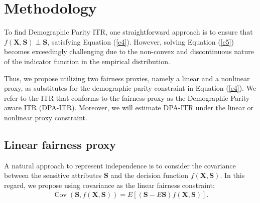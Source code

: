 \documentclass[12pt]{article}
\theoremstyle{plain}
\theoremstyle{definition}
\theoremstyle{remark}
\begin{document}
\section{Methodology}

To find    Demographic Parity ITR, one straightforward approach is to ensure that $f(\boldsymbol{X}, \boldsymbol{S}) \perp \boldsymbol{S}$, satisfying Equation (\ref{e4}). However, solving Equation (\ref{e5}) becomes exceedingly challenging due to the non-convex and discontinuous nature of the indicator function in the empirical distribution.

Thus, we propose utilizing two fairness proxies, namely a linear and a nonlinear proxy, as substitutes for the demographic parity constraint in Equation (\ref{e4}). We refer to the ITR that conforms to the fairness proxy as the Demographic Parity-aware ITR (DPA-ITR). Moreover, we will estimate DPA-ITR under the linear or nonlinear proxy constraint.




\subsection{Linear  fairness  proxy}



A natural approach to represent independence is to consider the covariance between the sensitive attributes $\boldsymbol{S}$ and the decision function $f(\boldsymbol{X}, \boldsymbol{S}).$ In this regard, we propose using covariance as the linear fairness constraint: %
\begin{equation}
\begin{aligned}
\operatorname{Cov}\left(\boldsymbol{S}, f(\boldsymbol{X}, \boldsymbol{S})\right)
=E\left[(\boldsymbol{S}-E\boldsymbol{S}) f(\boldsymbol{X}, \boldsymbol{S})\right].
\nonumber
\end{aligned}
\end{equation}
\end{document}
